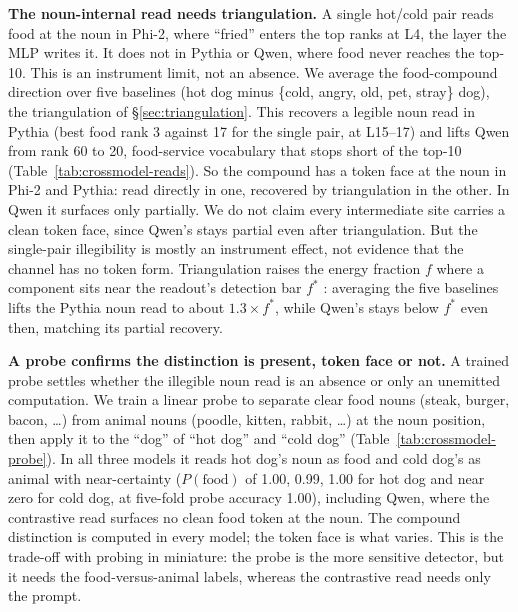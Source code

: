 \documentclass[11pt]{article}
\begin{document}
\textbf{The noun-internal read needs triangulation.} A single hot/cold pair
reads food at the noun in Phi-2, where ``fried'' enters the top ranks at L4, the
layer the MLP writes it. It does not in Pythia or Qwen, where food never reaches
the top-10. This is an instrument limit, not an absence. We average the
food-compound direction over five baselines (hot dog minus \{cold, angry, old,
pet, stray\} dog), the triangulation of \S\ref{sec:triangulation}. This recovers
a legible noun read in Pythia (best food rank 3 against 17 for the single pair,
at L15--17) and lifts Qwen from rank 60 to 20, food-service vocabulary that stops
short of the top-10 (Table~\ref{tab:crossmodel-reads}). So the compound has a token face at the noun in Phi-2 and
Pythia: read directly in one, recovered by triangulation in the other. In Qwen
it surfaces only partially. We do not claim every intermediate site carries a
clean token face, since Qwen's stays partial even after triangulation. But the
single-pair illegibility is mostly an instrument effect, not evidence that the
channel has no token form. Triangulation raises the energy fraction $f$ where a
component sits near the readout's detection bar $f^{*}$
\citep{tuomi2026visibility}: averaging the five baselines lifts the Pythia noun
read to about $1.3\times f^{*}$, while Qwen's stays below $f^{*}$ even then,
matching its partial recovery.

\textbf{A probe confirms the distinction is present, token face or not.} A
trained probe settles whether the illegible noun read is an absence or only an
unemitted computation. We train a linear probe to separate clear food nouns
(steak, burger, bacon, \ldots) from animal nouns (poodle, kitten, rabbit, \ldots)
at the noun position, then apply it to the ``dog'' of ``hot dog'' and ``cold
dog'' (Table~\ref{tab:crossmodel-probe}). In all three models it reads hot dog's
noun as food and cold dog's as animal with near-certainty ($P(\text{food})$ of
1.00, 0.99, 1.00 for hot dog and near zero for cold dog, at five-fold probe
accuracy 1.00), including Qwen, where the contrastive read surfaces no clean food
token at the noun. The compound distinction is computed in every model; the token
face is what varies. This is the trade-off with probing in miniature: the probe
is the more sensitive detector, but it needs the food-versus-animal labels,
whereas the contrastive read needs only the prompt.
\end{document}
